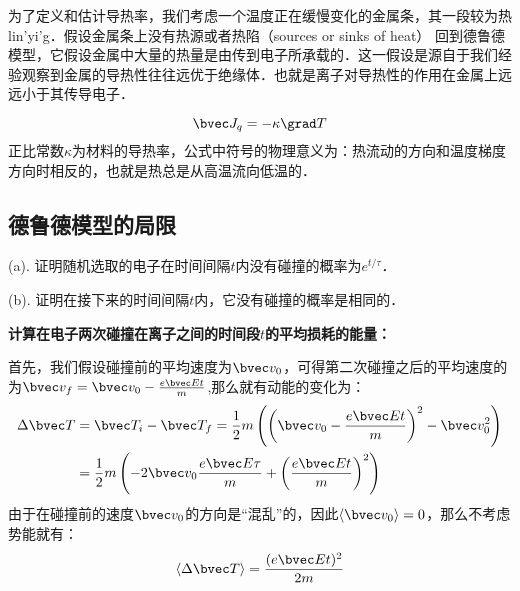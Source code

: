 为了定义和估计导热率，我们考虑一个温度正在缓慢变化的金属条，其一段较为热lin'yi'g．假设金属条上没有热源或者热陷（sources or sinks of heat）
回到德鲁德模型，它假设金属中大量的热量是由传到电子所承载的．这一假设是源自于我们经验观察到金属的导热性往往远优于绝缘体．也就是离子对导热性的作用在金属上远远小于其传导电子．

\begin{equation}
\bvec J_q =-\kappa\grad T
\end{equation}
正比常数$\kappa$为材料的导热率，公式中符号的物理意义为：热流动的方向和温度梯度方向时相反的，也就是热总是从高温流向低温的．
\subsection{德鲁德模型的局限}

\begin{example}{}
(a). 证明随机选取的电子在时间间隔$t$内没有碰撞的概率为$e^{t/\tau}$．

(b). 证明在接下来的时间间隔$t$内，它没有碰撞的概率是相同的．
\end{example}
\begin{example}{}
\textbf{计算在电子两次碰撞在离子之间的时间段$t$的平均损耗的能量：}

首先，我们假设碰撞前的平均速度为$\bvec v_0$，可得第二次碰撞之后的平均速度的为$\bvec v_f=\bvec v_0 -\frac{e\bvec E t}{m}$,那么就有动能的变化为：
\begin{align}
\Delta \bvec T &= \bvec T_i-\bvec T_f=\frac{1}{2}m\left(\left(\bvec v_0 -\frac{e\bvec E t}{m}\right)^2-\bvec v_0^2\right)\\
&=\frac{1}{2}m\left(-2\bvec v_0\frac{e\bvec E \tau}{m}+\left(\frac{e\bvec E t}{m}\right)^2\right)\\
\end{align}
由于在碰撞前的速度$\bvec v_0$的方向是“混乱”的，因此$\langle \bvec v_0\rangle = 0$，那么不考虑势能就有：
\begin{equation}
\langle \Delta \bvec T \rangle = \frac{(e\bvec E t)^2}{2m}
\end{equation}
\end{example}
